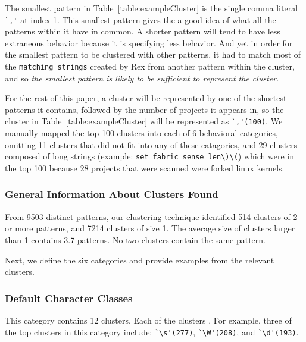 The smallest pattern in Table~\ref{table:exampleCluster} is the single comma literal \verb!`,'! at index 1.  This smallest pattern gives the a good idea of what all the patterns within it have in common.  A shorter pattern will tend to have less extraneous behavior because it is specifying less behavior.  And yet in order for the smallest pattern to be clustered with other patterns, it had to match most of the {\tt matching\_strings} created by Rex from another pattern within the cluster, and so \emph{the smallest pattern is likely to be sufficient to represent the cluster}.

For the rest of this paper, a cluster will be represented by one of the shortest patterns it contains, followed by the number of projects it appears in, so the cluster in Table~\ref{table:exampleCluster} will be represented as \verb!`,'(100)!.
We  manually mapped the top 100 clusters into each of 6 behavioral categories, omitting 11 clusters that did not fit into any of these catagories, and 29 clusters composed of long strings (example: \verb!set_fabric_sense_len\)\(!) which were in the top 100 because 28 projects that were scanned were forked linux kernels.


\subsubsection{General Information About Clusters Found}
From 9503 distinct patterns, our clustering technique identified 514 clusters of 2 or more patterns, and 7214 clusters of size 1.  The average size of clusters larger than 1 contains 3.7 patterns.
No two clusters contain the same pattern.


Next, we define the six categories and provide examples from the relevant clusters.  

\subsubsection{Default Character Classes}
This category contains 12 clusters. Each of the clusters . For example, three of the top clusters in this category include:
\verb!`\s'(277)!, \verb!`\W'(208)!, and \verb!`\d'(193)!.

